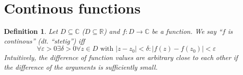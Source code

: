 \documentclass[a4paper,landscape,twocolumn]{article}
\newtheorem{defi}{Definition}
\newcommand\abs[1]{\left|#1\right|}
\begin{document}
\section{Continous functions}
\begin{defi}
  Let $D \subseteq \mathbb C$ ($D \subseteq \mathbb R$) and $f: D \rightarrow \mathbb C$
  be a function. We say \enquote{$f$ is continous} (dt. \foreignlanguage{ngerman}{\enquote{stetig}}) iff
  \[
    \forall \varepsilon > 0 \exists \delta > 0
    \forall z \in D \text{ with } \abs{z - z_0} < \delta:
    \abs{f(z) - f(z_0)} < \varepsilon
  \]
  Intuitively, the difference of function values are arbitrary close to each other
  if the difference of the arguments is sufficiently small.
\end{defi}

\end{document}

